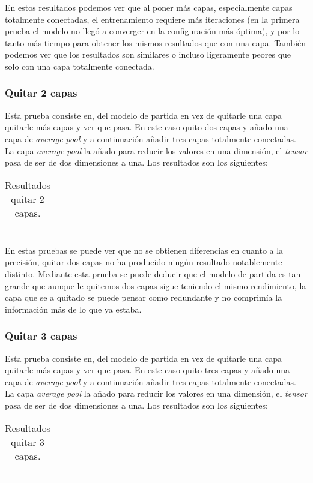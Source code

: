 \documentclass[12pt,a4paper]{article}
\begin{document}
En estos resultados podemos ver que al poner más capas, especialmente capas totalmente conectadas, el entrenamiento requiere más iteraciones (en la primera prueba el modelo no llegó a converger en la configuración más óptima), y por lo tanto más tiempo para obtener los mismos resultados que con una capa. También podemos ver que los resultados son similares o incluso ligeramente peores que solo con una capa totalmente conectada.

\subsubsection{Quitar 2 capas}
Esta prueba consiste en, del modelo de partida en vez de quitarle una capa quitarle más capas y ver que pasa. En este caso quito dos capas y añado una capa de \textit{average pool} y a continuación añadir tres capas totalmente conectadas. La capa \textit{average pool} la añado para reducir los valores en una dimensión, el \textit{tensor} pasa de ser de dos dimensiones a una. Los resultados son los siguientes:
\begin{table}[H]
\centering
\begin{tabular}{|l|l|l|}
\hline
 &  &  \\ \hline
 &  &  \\ \hline
 &  &  \\ \hline
\end{tabular}
\caption{Resultados quitar 2 capas.}
\end{table}

En estas pruebas se puede ver que no se obtienen diferencias en cuanto a la precisión, quitar dos capas no ha producido ningún resultado notablemente distinto. Mediante esta prueba se puede deducir que el modelo de partida es tan grande que aunque le quitemos dos capas sigue teniendo el mismo rendimiento, la capa que se a quitado se puede pensar como redundante y no comprimía la información más de lo que ya estaba.

\subsubsection{Quitar 3 capas}
Esta prueba consiste en, del modelo de partida en vez de quitarle una capa quitarle más capas y ver que pasa. En este caso quito tres capas y añado una capa de \textit{average pool} y a continuación añadir tres capas totalmente conectadas. La capa \textit{average pool} la añado para reducir los valores en una dimensión, el \textit{tensor} pasa de ser de dos dimensiones a una. Los resultados son los siguientes:
\begin{table}[H]
\centering
\begin{tabular}{|l|l|l|}
\hline
 &  &  \\ \hline
 &  &  \\ \hline
 &  &  \\ \hline
\end{tabular}
\caption{Resultados quitar 3 capas.}
\end{table}
\end{document}
